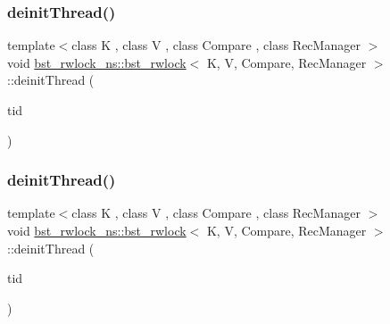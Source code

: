 \mbox{\label{classbst__rwlock__ns_1_1bst__rwlock_aea88265b9703e71e6d1ee91814163fd8}} 
\subsubsection{\texorpdfstring{deinit\+Thread()}{deinitThread()}\hspace{0.1cm}{\footnotesize\ttfamily [1/2]}}
{\footnotesize\ttfamily template$<$class K , class V , class Compare , class Rec\+Manager $>$ \\
void \hyperlink{classbst__rwlock__ns_1_1bst__rwlock}{bst\+\_\+rwlock\+\_\+ns\+::bst\+\_\+rwlock}$<$ K, V, Compare, Rec\+Manager $>$\+::deinit\+Thread (\begin{DoxyParamCaption}\item[{const int}]{tid }\end{DoxyParamCaption})\hspace{0.3cm}{\ttfamily [inline]}}

\mbox{\label{classbst__rwlock__ns_1_1bst__rwlock_aea88265b9703e71e6d1ee91814163fd8}} 
\subsubsection{\texorpdfstring{deinit\+Thread()}{deinitThread()}\hspace{0.1cm}{\footnotesize\ttfamily [2/2]}}
{\footnotesize\ttfamily template$<$class K , class V , class Compare , class Rec\+Manager $>$ \\
void \hyperlink{classbst__rwlock__ns_1_1bst__rwlock}{bst\+\_\+rwlock\+\_\+ns\+::bst\+\_\+rwlock}$<$ K, V, Compare, Rec\+Manager $>$\+::deinit\+Thread (\begin{DoxyParamCaption}\item[{const int}]{tid }\end{DoxyParamCaption})\hspace{0.3cm}{\ttfamily [inline]}}

